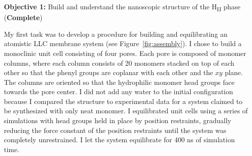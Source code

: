 \documentclass{article}
\begin{document}
  \textbf{\large Objective 1:} {\large Build and understand the nanoscopic structure
  of the H\textsubscript{II} phase} (\textcolor{green!40!olive}{\textbf{Complete}})

  My first task was to develop a procedure for building and equilibrating 
  an atomistic LLC membrane system (see Figure~\ref{fig:assembly}). I chose to build
  a monoclinic unit cell consisting of four pores. Each pore is composed of monomer
  columns, where each column consists of 20 monomers stacked on top of each other
  so that the phenyl groups are coplanar with each other and the $xy$ plane. The
  columns are oriented so that the hydrophilic monomer head groups face towards
  the pore center. I did not add any water to the initial configuration because I
  compared the structure to experimental data for a system claimed to be
  synthesized with only neat monomer. I equilibrated unit cells using a series
  of simulations with head groups held in place by position restraints, gradually
  reducing the force constant of the position restraints until the system
  was completely unrestrained. I let the system equilibrate for 400 ns of simulation
  time.
\end{document}
